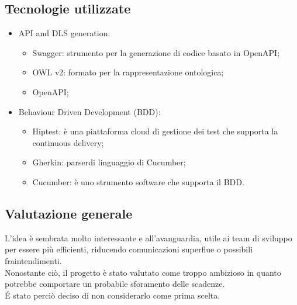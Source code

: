 \subsection{Tecnologie utilizzate}
\begin{itemize}
\item API and DLS generation: \begin{itemize}
\item Swagger: strumento per la generazione di codice basato in OpenAPI;
\item OWL v2: formato per la rappresentazione ontologica;
\item OpenAPI;	
\end{itemize}
\item Behaviour Driven Development (BDD\glo): \begin{itemize}
\item Hiptest: è una piattaforma cloud di gestione dei test che supporta la continuous delivery\glo;
\item Gherkin: parser\glo di linguaggio di Cucumber;
\item Cucumber: è uno strumento software che supporta il BDD.
\end{itemize}
\end{itemize}

\subsection{Valutazione generale}
L’idea è sembrata molto interessante e all’avanguardia, utile ai team di sviluppo per essere più efficienti, riducendo comunicazioni superflue o possibili fraintendimenti.  \\
Nonostante ciò, il progetto è stato valutato come troppo ambizioso in quanto potrebbe comportare un probabile sforamento delle scadenze.  \\
\'E stato perciò deciso di non considerarlo come prima scelta.




